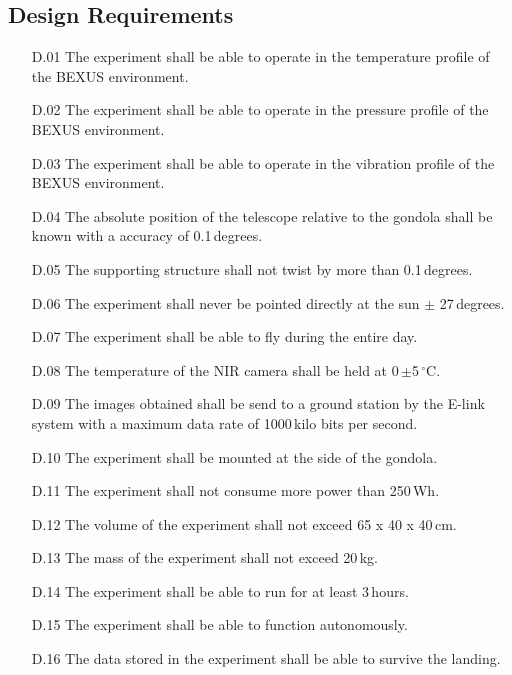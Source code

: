 \subsection{Design Requirements}

\begin{enumerate}
	\item[D.01] The experiment shall be able to operate in the temperature profile of the BEXUS environment.
	\item[D.02] The experiment shall be able to operate in the pressure profile of the BEXUS environment.
    \item[D.03] The experiment shall be able to operate in the vibration profile of the BEXUS environment.
    \item[D.04] The absolute position of the telescope relative to the gondola shall be known with a accuracy of 0.1\,degrees.
	\item[D.05] The supporting structure shall not twist by more than 0.1\,degrees.
	\item[D.06] The experiment shall never be pointed directly at the sun $\pm$ 27\,degrees.
	\item[D.07] The experiment shall be able to fly during the entire day.
	\item[D.08] The temperature of the NIR camera shall be held at 0\,$\pm$5\,$^\circ$C.
	\item[D.09] The images obtained shall be send to a ground station by the E-link system with a maximum data rate of 1000\,kilo bits per second.
	\item[D.10] The experiment shall be mounted at the side of the gondola.
	\item[D.11] The experiment shall not consume more power than 250\,Wh.
    \item[D.12] The volume of the experiment shall not exceed 65 x 40 x 40\,cm.
    \item[D.13] The mass of the experiment shall not exceed 20\,kg.
    \item[D.14] The experiment shall be able to run for at least 3\,hours.
    \item[D.15] The experiment shall be able to function autonomously.
    \item[D.16] The data stored in the experiment shall be able to survive the landing.
\end{enumerate}